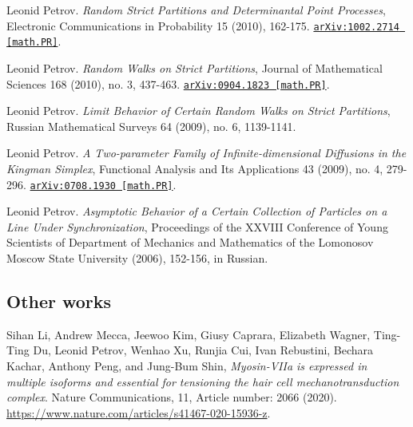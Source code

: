 \documentclass[letterpaper,11pt]{article}
\begin{document}
\begin{etaremune}
	
	
	\item 
	Leonid Petrov.
	\emph{Random Strict Partitions and Determinantal Point Processes}, Electronic Communications in Probability 15 (2010), 162-175. 
	\href{https://arxiv.org/abs/1002.2714}{\texttt{arXiv:1002.2714 [math.PR]}}.
	
	
	
	
	
	
	
	\item 
	Leonid Petrov.
	\emph{Random Walks on Strict Partitions}, Journal of Mathematical Sciences 168 (2010), no. 3, 437-463. 
	\href{https://arxiv.org/abs/0904.1823}{\texttt{arXiv:0904.1823 [math.PR]}}.
	
	
	
	\item 
	Leonid Petrov.
	\emph{Limit Behavior of Certain Random Walks on Strict Partitions}, Russian Mathematical Surveys 64 (2009), no. 6, 1139-1141. 
	
	
	
	
	\item 
	Leonid Petrov.
	\emph{A Two-parameter Family of Infinite-dimensional Diffusions in the Kingman Simplex}, Functional Analysis and Its Applications 43 (2009), no. 4, 279-296. 
	\href{https://arxiv.org/abs/0708.1930}{\texttt{arXiv:0708.1930 [math.PR]}}.
	
	
	
	\item 
	Leonid Petrov.
	\emph{Asymptotic Behavior of a Certain Collection of Particles on a Line Under Synchronization}, Proceedings of the XXVIII Conference of Young Scientists of Department of Mechanics and Mathematics of the Lomonosov Moscow State University (2006), 152-156, in Russian. 
	
	
	
	\end{etaremune}
	
	\subsection*{Other works}
	
	\begin{etaremune}
		\renewcommand{\labelenumi}{[\theenumi]}
		\item
		Sihan Li, Andrew Mecca, Jeewoo Kim, Giusy Caprara, Elizabeth Wagner, Ting-Ting Du, Leonid Petrov, Wenhao Xu, Runjia Cui, Ivan Rebustini, Bechara Kachar, Anthony Peng, and Jung-Bum Shin,
		\emph{Myosin-VIIa is expressed in multiple isoforms and essential for tensioning the hair cell mechanotransduction complex}.
		Nature Communications, 11, Article number: 2066 (2020). \url{https://www.nature.com/articles/s41467-020-15936-z}.
	\end{etaremune}
\end{document}
